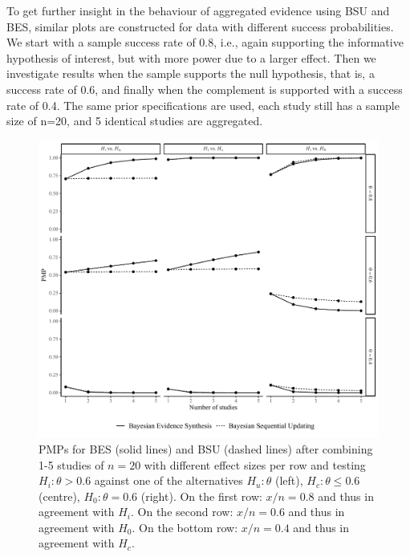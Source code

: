 \documentclass[11pt,reqno]{article}
\begin{document}
To get further insight in the behaviour of aggregated evidence using BSU and BES, similar plots are constructed for data with different success probabilities. We start with a sample success rate of 0.8, i.e., again supporting the informative hypothesis of interest, but with more power due to a larger effect. Then we investigate results when the sample supports the null hypothesis, that is, a success rate of 0.6, and finally when the complement is supported with a success rate of 0.4. The same prior specifications are used, each study still has a sample size of n=20, and 5 identical studies are aggregated.


\begin{figure}[!ht]
   \centerline{\includegraphics[width=14cm]{r-files-bes-klugkist-volker-2022/Figures/bes_bsu_pmp}}
 \caption{PMPs for BES (solid lines) and BSU (dashed lines) after combining 1-5 studies of $n=20$ with different effect sizes per row and testing $H_i: \theta>0.6$ against one of the alternatives $H_u: \theta$ (left), $H_c: \theta \leq 0.6$ (centre), $H_0: \theta=0.6$ (right). On the first row: $x/n=0.8$ and thus in agreement with $H_i$. On the second row: $x/n=0.6$ and thus in agreement with $H_0$. On the bottom row: $x/n=0.4$ and thus in agreement with $H_c$.}
 \label{aggre2}
\end{figure}
\end{document}
